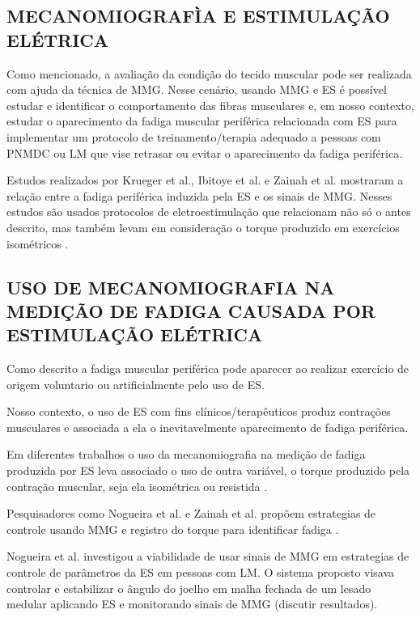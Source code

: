 \subsection{MECANOMIOGRAFÌA E ESTIMULAÇÃO ELÉTRICA}
Como mencionado, a avaliação da condição do tecido muscular pode ser realizada com ajuda da técnica de \acrshort{MMG}. Nesse cenário, usando \acrshort{MMG} e \acrshort{ES} é possível estudar e identificar o comportamento das fibras musculares \cite{Krueger2014} e, em nosso contexto, estudar o aparecimento da fadiga muscular periférica relacionada com \acrshort{ES} para implementar um protocolo de treinamento/terapia adequado a pessoas com \acrshort{PNMDC} ou \acrshort{LM} que vise retrasar ou evitar o aparecimento da fadiga periférica. 

Estudos realizados por Krueger et al., Ibitoye et al. e Zainah et al. mostraram a relação entre a fadiga periférica induzida pela \acrshort{ES} e os sinais de \acrshort{MMG}. Nesses estudos são usados protocolos de eletroestimulação que relacionam não só o antes descrito, mas também levam em consideração o torque produzido em exercícios isométricos \cite{Krueger2014, Zainah2017, Ibitoye2014}. 

\subsection{USO DE MECANOMIOGRAFIA NA MEDIÇÃO DE FADIGA CAUSADA POR ESTIMULAÇÃO ELÉTRICA}
Como descrito a fadiga muscular periférica pode aparecer ao realizar exercício de origem voluntario ou artificialmente pelo uso de \acrshort{ES}.

Nosso contexto, o uso de \acrshort{ES} com fins clínicos/terapêuticos produz contrações musculares e associada a ela o inevitavelmente aparecimento de fadiga periférica.

Em diferentes trabalhos o uso da mecanomiografia na medição de fadiga produzida por \acrshort{ES} leva associado o uso de outra variável, o torque produzido pela contração muscular, seja ela isométrica ou resistida \cite{Madeleine2001, Zainah2017, Ibitoye2014, NogueiraNeto2013}. 

Pesquisadores como Nogueira et al. e Zainah et al. propõem estrategias de controle usando \acrshort{MMG} e registro do torque para identificar fadiga \cite{Zainah2017, NogueiraNeto2013}. 

Nogueira et al. investigou a viabilidade de usar sinais de \acrshort{MMG} em estrategias de controle de parâmetros da \acrshort{ES} em pessoas com \acrshort{LM}. O sistema proposto visava controlar e estabilizar o ângulo do joelho em malha fechada de um lesado medular aplicando \acrshort{ES} e monitorando sinais de \acrshort{MMG} (discutir resultados). 

